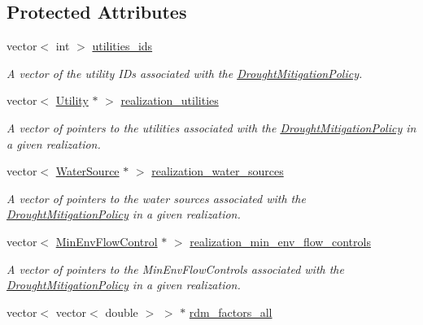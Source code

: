 \subsection*{Protected Attributes}
\begin{DoxyCompactItemize}
\item 
vector$<$ int $>$ \mbox{\hyperlink{classDroughtMitigationPolicy_ad19fbc5a9fdf17ed50c0ba0b99d47eca}{utilities\+\_\+ids}}
\begin{DoxyCompactList}\small\item\em A vector of the utility I\+Ds associated with the \mbox{\hyperlink{classDroughtMitigationPolicy}{Drought\+Mitigation\+Policy}}. \end{DoxyCompactList}\item 
vector$<$ \mbox{\hyperlink{classUtility}{Utility}} $\ast$ $>$ \mbox{\hyperlink{classDroughtMitigationPolicy_af6e5787a58017804d8598effbeeaba8e}{realization\+\_\+utilities}}
\begin{DoxyCompactList}\small\item\em A vector of pointers to the utilities associated with the \mbox{\hyperlink{classDroughtMitigationPolicy}{Drought\+Mitigation\+Policy}} in a given realization. \end{DoxyCompactList}\item 
vector$<$ \mbox{\hyperlink{classWaterSource}{Water\+Source}} $\ast$ $>$ \mbox{\hyperlink{classDroughtMitigationPolicy_ae2104e99c421513902ba66d012484c0e}{realization\+\_\+water\+\_\+sources}}
\begin{DoxyCompactList}\small\item\em A vector of pointers to the water sources associated with the \mbox{\hyperlink{classDroughtMitigationPolicy}{Drought\+Mitigation\+Policy}} in a given realization. \end{DoxyCompactList}\item 
vector$<$ \mbox{\hyperlink{classMinEnvFlowControl}{Min\+Env\+Flow\+Control}} $\ast$ $>$ \mbox{\hyperlink{classDroughtMitigationPolicy_af583979405bc5d530ee576df8a6e9324}{realization\+\_\+min\+\_\+env\+\_\+flow\+\_\+controls}}
\begin{DoxyCompactList}\small\item\em A vector of pointers to the Min\+Env\+Flow\+Controls associated with the \mbox{\hyperlink{classDroughtMitigationPolicy}{Drought\+Mitigation\+Policy}} in a given realization. \end{DoxyCompactList}\item 
vector$<$ vector$<$ double $>$ $>$ $\ast$ \mbox{\hyperlink{classDroughtMitigationPolicy_a4c5a2dc2aa3a1c7550cdb17045e1fef3}{rdm\+\_\+factors\+\_\+all}}

\end{DoxyCompactItemize}
